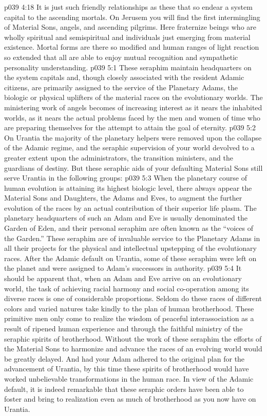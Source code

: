 \vs p039 4:18 It is just such friendly relationships as these that so endear a system capital to the ascending mortals. On Jerusem you will find the first intermingling of Material Sons, angels, and ascending pilgrims. Here fraternize beings who are wholly spiritual and semispiritual and individuals just emerging from material existence. Mortal forms are there so modified and human ranges of light reaction so extended that all are able to enjoy mutual recognition and sympathetic personality understanding.
\vs p039 5:1 These seraphim maintain headquarters on the system capitals and, though closely associated with the resident Adamic citizens, are primarily assigned to the service of the Planetary Adams, the biologic or physical uplifters of the material races on the evolutionary worlds. The ministering work of angels becomes of increasing interest as it nears the inhabited worlds, as it nears the actual problems faced by the men and women of time who are preparing themselves for the attempt to attain the goal of eternity.
\vs p039 5:2 On Urantia the majority of the planetary helpers were removed upon the collapse of the Adamic regime, and the seraphic supervision of your world devolved to a greater extent upon the administrators, the transition ministers, and the guardians of destiny. But these seraphic aids of your defaulting Material Sons still serve Urantia in the following groups:
\vs p039 5:3 \pc {}\bibnobreakspace {} When the planetary course of human evolution is attaining its highest biologic level, there always appear the Material Sons and Daughters, the Adams and Eves, to augment the further evolution of the races by an actual contribution of their superior life plasm. The planetary headquarters of such an Adam and Eve is usually denominated the Garden of Eden, and their personal seraphim are often known as the “voices of the Garden.” These seraphim are of invaluable service to the Planetary Adams in all their projects for the physical and intellectual upstepping of the evolutionary races. After the Adamic default on Urantia, some of these seraphim were left on the planet and were assigned to Adam’s successors in authority.
\vs p039 5:4 \pc {}\bibnobreakspace {} It should be apparent that, when an Adam and Eve arrive on an evolutionary world, the task of achieving racial harmony and social co\hyp{}operation among its diverse races is one of considerable proportions. Seldom do these races of different colors and varied natures take kindly to the plan of human brotherhood. These primitive men only come to realize the wisdom of peaceful interassociation as a result of ripened human experience and through the faithful ministry of the seraphic spirits of brotherhood. Without the work of these seraphim the efforts of the Material Sons to harmonize and advance the races of an evolving world would be greatly delayed. And had your Adam adhered to the original plan for the advancement of Urantia, by this time these spirits of brotherhood would have worked unbelievable transformations in the human race. In view of the Adamic default, it is indeed remarkable that these seraphic orders have been able to foster and bring to realization even as much of brotherhood as you now have on Urantia.
